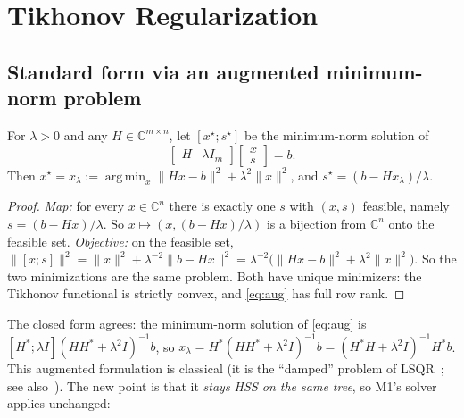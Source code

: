 \section{Tikhonov Regularization}\label{sec:tikhonov}

\subsection{Standard form via an augmented minimum-norm problem}

\begin{lemma}[augmentation]\label{lem:aug}
For $\lambda>0$ and any $H\in\mathbb{C}^{m\times n}$, let $[x^\star;s^\star]$ be the minimum-norm solution of
\begin{equation}\label{eq:aug}
\begin{bmatrix}H & \lambda I_m\end{bmatrix}\begin{bmatrix}x\\ s\end{bmatrix}=b .
\end{equation}
Then $x^\star=x_\lambda:=\operatorname*{arg\,min}_x\|Hx-b\|^2+\lambda^2\|x\|^2$, and $s^\star=(b-Hx_\lambda)/\lambda$.
\end{lemma}
\begin{proof}
\emph{Map:} for every $x\in\mathbb{C}^n$ there is exactly one $s$ with $(x,s)$ feasible, namely
$s=(b-Hx)/\lambda$. So $x\mapsto(x,(b-Hx)/\lambda)$ is a bijection from $\mathbb{C}^n$ onto the feasible set.
\emph{Objective:} on the feasible set,
$\|[x;s]\|^2=\|x\|^2+\lambda^{-2}\|b-Hx\|^2=\lambda^{-2}\big(\|Hx-b\|^2+\lambda^2\|x\|^2\big)$.
So the two minimizations are the same problem. Both have unique minimizers: the Tikhonov
functional is strictly convex, and \eqref{eq:aug} has full row rank.
\end{proof}
The closed form agrees: the minimum-norm solution of \eqref{eq:aug} is
$[H^*;\lambda I](HH^*+\lambda^2I)^{-1}b$, so $x_\lambda=H^*(HH^*+\lambda^2I)^{-1}b=(H^*H+\lambda^2I)^{-1}H^*b$.
This augmented formulation is classical (it is the ``damped'' problem of LSQR~\cite{lsqr}; see also~\cite{hansen}). The new point is
that it \emph{stays HSS on the same tree}, so M1's solver applies unchanged:

